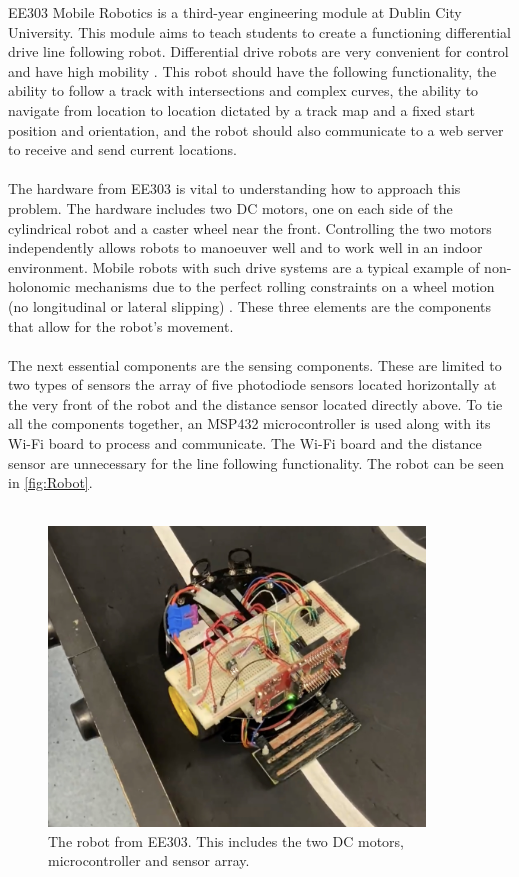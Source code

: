 \documentclass[a4paper,12pt]{article}
\begin{document}
EE303 Mobile Robotics is a third-year engineering module at Dublin City University. This module aims to teach students to create a functioning differential drive line following robot. Differential drive robots are very convenient for control and have high mobility \cite{bakirci2022kinematics}. This robot should have the following functionality, the ability to follow a track with intersections and complex curves, the ability to navigate from location to location dictated by a track map and a fixed start position and orientation, and the robot should also communicate to a web server to receive and send current locations.
\\\\
The hardware from EE303 is vital to understanding how to approach this problem. The hardware includes two DC motors, one on each side of the cylindrical robot and a caster wheel near the front. Controlling the two motors independently allows robots to manoeuver well and to work well in an indoor environment. Mobile robots with such drive systems are a typical example of non-holonomic mechanisms due to the perfect rolling constraints on a wheel motion (no longitudinal or lateral slipping) \cite{Malu}. These three elements are the components that allow for the robot's movement. 
\\\\
The next essential components are the sensing components. These are limited to two types of sensors the array of five photodiode sensors located horizontally at the very front of the robot and the distance sensor located directly above. To tie all the components together, an MSP432 \cite{msp432} microcontroller is used along with its Wi-Fi board to process and communicate. The Wi-Fi board and the distance sensor are unnecessary for the line following functionality. The robot can be seen in \autoref{fig:Robot}.
\\\\
\begin{figure}[H]
\centering
\includegraphics[width=10cm]{imgs/Robot.jpg}
\caption{The robot from EE303. This includes the two DC motors, microcontroller and sensor array.}
\label{fig:Robot}
\end{figure}
\end{document}
